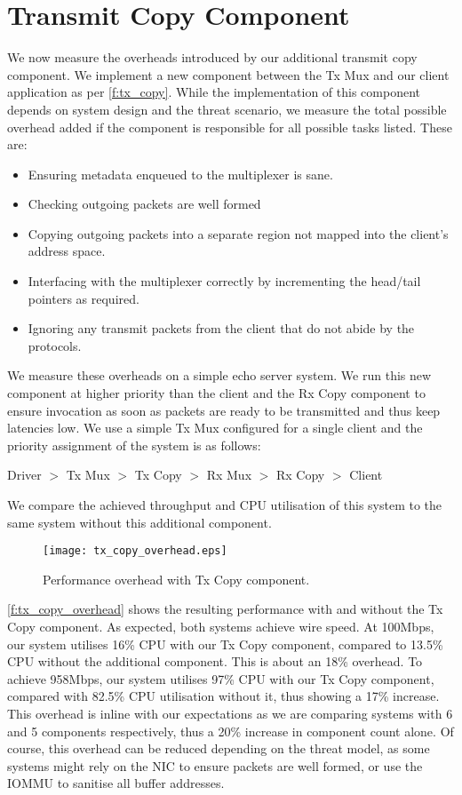 \section{Transmit Copy Component}

We now measure the overheads introduced by our additional transmit copy component. We implement a new
component between the Tx Mux and our client application as per \autoref{f:tx_copy}. While the implementation
of this component depends on system design and the threat scenario, we measure the total possible overhead
added if the component is responsible for all possible tasks listed. These are:
\begin{itemize}
    \item Ensuring metadata enqueued to the multiplexer is sane.
    \item Checking outgoing packets are well formed 
    \item Copying outgoing packets into a separate region not mapped
          into the client's address space.
    \item Interfacing with the multiplexer correctly by incrementing the head/tail pointers as required.
    \item Ignoring any transmit packets from the client that do not abide by the protocols.
\end{itemize}

We measure these overheads on a simple echo server system. We run this new component at higher priority than the client
and the Rx Copy component to ensure invocation as soon as packets are ready to be transmitted and thus keep
latencies low. We use a simple Tx Mux configured for a single client and the priority assignment of the system is as follows:\\
\centerline{Driver \(>\) Tx Mux  \(>\) Tx Copy \(>\) Rx Mux \(>\) Rx Copy \(>\) Client}

We compare the achieved throughput and CPU utilisation of this system to the same system without this additional component. 

\begin{figure}[h]
    \centering
    \texttt{[image: tx\_copy\_overhead.eps]}
    \caption{Performance overhead with Tx Copy component.}
    \label{f:tx_copy_overhead}
\end{figure}

\autoref{f:tx_copy_overhead} shows the resulting performance with and without the Tx Copy component. As expected, both
systems achieve wire speed. At 100Mbps, our system utilises 16\% CPU with our Tx Copy component, compared to 13.5\% CPU 
without the additional component. This is about an 18\% overhead. To achieve 958Mbps, our system utilises 97\% CPU with our Tx
Copy component, compared with 82.5\% CPU utilisation without it, thus showing a 17\% increase. This overhead is 
inline with our expectations as we are comparing systems with 6 and 5 components respectively, thus a 20\% increase
in component count alone. Of course, this overhead can be reduced depending on the threat model, as some systems might
rely on the NIC to ensure packets are well formed, or use the IOMMU to sanitise all buffer addresses.  

